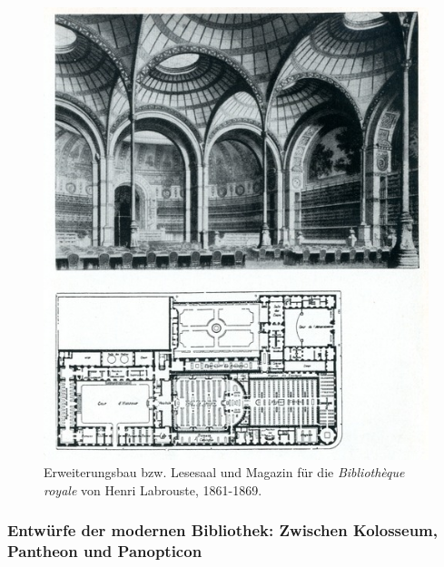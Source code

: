 \begin{figure}[htbp]
\centering
\includegraphics{img/wagner-6.jpg}
\caption{Erweiterungsbau bzw. Lesesaal und Magazin für die
\emph{Bibliothèque royale} von Henri Labrouste, 1861-1869.}
\end{figure}

\subsubsection{Entwürfe der modernen Bibliothek: Zwischen Kolosseum,
Pantheon und
Panopticon}\label{entwuxfcrfe-der-modernen-bibliothek-zwischen-kolosseum-pantheon-und-panopticon}

